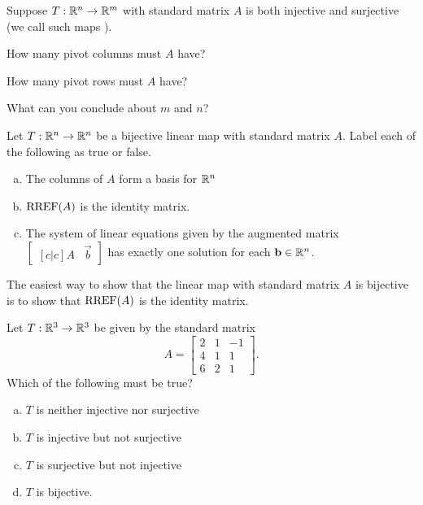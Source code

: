 \begin{applicationActivities}
\begin{activity}{5}
Suppose \(T: \mathbb{R}^n \rightarrow \mathbb{R}^m\) with standard matrix \(A\) is both injective and surjective (we call such maps ).
\begin{subactivity}
 How many pivot columns must \(A\) have?
\end{subactivity}
\begin{subactivity}
How many pivot rows must \(A\) have?
\end{subactivity}
\begin{subactivity}
What can you conclude about \(m\) and \(n\)?
\end{subactivity}
\end{activity}


\begin{activity}{5}
Let $T: \mathbb{R}^n \rightarrow \mathbb{R}^n$ be a bijective linear map with
standard matrix $A$. Label each of the following as true or false.
\begin{enumerate}[(a)]
\item The columns of $A$ form a basis for $\mathbb{R}^n$
\item $\operatorname{RREF}(A)$ is the identity matrix.
\item The system of linear equations given by the augmented matrix $\begin{bmatrix}[c|c] A & \vec{b} \end{bmatrix}$ has exactly one solution
for each \(\mathbf b \in \mathbb{R}^n\).
\end{enumerate}
\end{activity}

\begin{observation}
  The easiest way to show that the linear map with standard matrix \(A\)
  is bijective is to show that \(\operatorname{RREF}(A)\) is the identity matrix.
\end{observation}

\begin{activity}{3}
Let $T: \mathbb{R}^3 \rightarrow \mathbb{R}^3$ be given by the standard matrix $$A=\begin{bmatrix} 2&1&-1 \\ 4&1&1 \\ 6&2&1\end{bmatrix}.$$ Which of the following must be true?
\begin{enumerate}[(a)]
\item $T$ is neither injective nor surjective
\item $T$ is injective but not surjective
\item $T$ is surjective but not injective
\item $T$ is bijective.
\end{enumerate}
\end{activity}


\end{applicationActivities}

